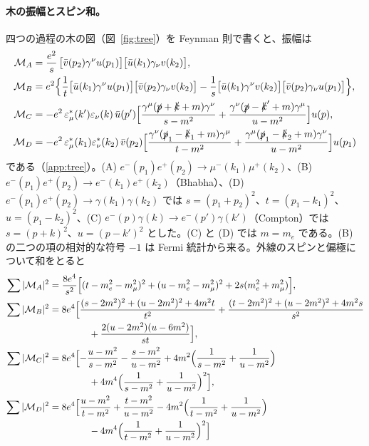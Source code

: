 \documentclass[a4paper,10pt]{ltjsarticle}
\begin{document}
\paragraph{木の振幅とスピン和。}四つの過程の木の図（図~\ref{fig:tree}）を Feynman 則で書くと、振幅は
\begin{equation}
\begin{aligned}
\mathcal M_A&=\frac{e^2}{s}\,\bigl[\bar v(p_2)\gamma^\nu u(p_1)\bigr]\bigl[\bar u(k_1)\gamma_\nu v(k_2)\bigr],\\
\mathcal M_B&=e^2\Bigl\{\frac1t\bigl[\bar u(k_1)\gamma^\nu u(p_1)\bigr]\bigl[\bar v(p_2)\gamma_\nu v(k_2)\bigr]-\frac1s\bigl[\bar u(k_1)\gamma^\nu v(k_2)\bigr]\bigl[\bar v(p_2)\gamma_\nu u(p_1)\bigr]\Bigr\},\\
\mathcal M_C&=-e^2\,\varepsilon^*_\mu(k')\varepsilon_\nu(k)\,\bar u(p')\Bigl[\frac{\gamma^\mu(\slashed p+\slashed k+m)\gamma^\nu}{s-m^2}+\frac{\gamma^\nu(\slashed p-\slashed k'+m)\gamma^\mu}{u-m^2}\Bigr]u(p),\\
\mathcal M_D&=-e^2\,\varepsilon^*_\mu(k_1)\varepsilon^*_\nu(k_2)\,\bar v(p_2)\Bigl[\frac{\gamma^\nu(\slashed p_1-\slashed k_1+m)\gamma^\mu}{t-m^2}+\frac{\gamma^\mu(\slashed p_1-\slashed k_2+m)\gamma^\nu}{u-m^2}\Bigr]u(p_1)
\end{aligned}
\label{eq:Mtree}
\end{equation}
である（\ref{app:tree}）。(A) $e^-(p_1)e^+(p_2)\to\mu^-(k_1)\mu^+(k_2)$、(B) $e^-(p_1)e^+(p_2)\to e^-(k_1)e^+(k_2)$（Bhabha）、(D) $e^-(p_1)e^+(p_2)\to\gamma(k_1)\gamma(k_2)$ では $s=(p_1+p_2)^2$、$t=(p_1-k_1)^2$、$u=(p_1-k_2)^2$、(C) $e^-(p)\gamma(k)\to e^-(p')\gamma(k')$（Compton）では $s=(p+k)^2$、$u=(p-k')^2$ とした。(C) と (D) では $m=m_e$ である。(B) の二つの項の相対的な符号 $-1$ は Fermi 統計から来る。外線のスピンと偏極について和をとると
\begin{equation}
\begin{aligned}
\sum|\mathcal M_A|^2&=\frac{8e^4}{s^2}\Bigl[(t-m_e^2-m_\mu^2)^2+(u-m_e^2-m_\mu^2)^2+2s(m_e^2+m_\mu^2)\Bigr],\\
\sum|\mathcal M_B|^2&=8e^4\Bigl[\frac{(s-2m^2)^2+(u-2m^2)^2+4m^2t}{t^2}+\frac{(t-2m^2)^2+(u-2m^2)^2+4m^2s}{s^2}\\
&\hspace{4.2em}+\frac{2(u-2m^2)(u-6m^2)}{st}\Bigr],\\
\sum|\mathcal M_C|^2&=8e^4\Bigl[-\frac{u-m^2}{s-m^2}-\frac{s-m^2}{u-m^2}+4m^2\Bigl(\frac{1}{s-m^2}+\frac{1}{u-m^2}\Bigr)\\
&\hspace{4.2em}+4m^4\Bigl(\frac{1}{s-m^2}+\frac{1}{u-m^2}\Bigr)^2\Bigr],\\
\sum|\mathcal M_D|^2&=8e^4\Bigl[\frac{u-m^2}{t-m^2}+\frac{t-m^2}{u-m^2}-4m^2\Bigl(\frac{1}{t-m^2}+\frac{1}{u-m^2}\Bigr)\\
&\hspace{4.2em}-4m^4\Bigl(\frac{1}{t-m^2}+\frac{1}{u-m^2}\Bigr)^2\Bigr]
\end{aligned}
\label{eq:sumtree}
\end{equation}
\end{document}
